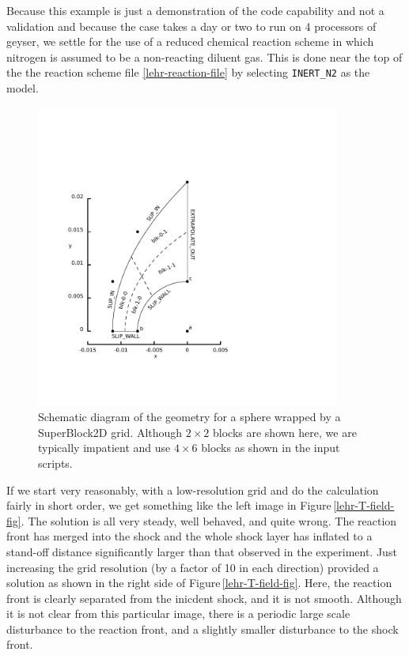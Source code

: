 \medskip
Because this example is just a demonstration of the code capability and not a validation
and because the case takes a day or two to run on 4 processors of geyser,
we settle for the use of a reduced chemical reaction scheme in which nitrogen is assumed to be
a non-reacting diluent gas.
This is done near the top of the the reaction scheme file \ref{lehr-reaction-file} 
by selecting \texttt{INERT\_N2} as the model.

\begin{figure}[htbp]
\begin{center}
\includegraphics[width=10cm,viewport=43 73 288 344,clip=true]{../2D/lehr-479/lehr-layout.pdf}
\end{center}
\caption{Schematic diagram of the geometry for a sphere wrapped by a SuperBlock2D grid.
   Although $2 \times 2$ blocks are shown here, we are typically impatient and 
   use $4 \times 6$ blocks as shown in the input scripts.}
\label{lehr-geometry-fig}
\end{figure}

\medskip
If we start very reasonably, with a low-resolution grid and do the calculation fairly in short order,
we get something like the left image in Figure\,\ref{lehr-T-field-fig}.
The solution is all very steady, well behaved, and quite wrong.
The reaction front has merged into the shock and the whole shock layer has inflated to a stand-off distance
significantly larger than that observed in the experiment.
Just increasing the grid resolution (by a factor of 10 in each direction) provided a solution as shown in the right
side of Figure\,\ref{lehr-T-field-fig}.
Here, the reaction front is clearly separated from the inicdent shock, and it is not smooth.
Although it is not clear from this particular image, there is a periodic large scale disturbance 
to the reaction front, and a slightly smaller disturbance to the shock front.

